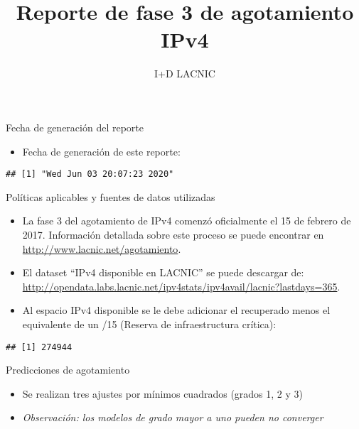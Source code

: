 \documentclass[ignorenonframetext,]{beamer}
\title{Reporte de fase 3 de agotamiento IPv4}
\author{I+D LACNIC}
\date{}
\providecommand{\tightlist}{%
  \setlength{\itemsep}{0pt}\setlength{\parskip}{0pt}}
\begin{document}
\frame{\titlepage}

\begin{frame}[fragile]{Fecha de generación del reporte}
\protect\hypertarget{fecha-de-generaciuxf3n-del-reporte}{}

\begin{itemize}
\tightlist
\item
  Fecha de generación de este reporte:
\end{itemize}

\begin{verbatim}
## [1] "Wed Jun 03 20:07:23 2020"
\end{verbatim}

\end{frame}

\begin{frame}[fragile]{Políticas aplicables y fuentes de datos
utilizadas}
\protect\hypertarget{poluxedticas-aplicables-y-fuentes-de-datos-utilizadas}{}

\begin{itemize}
\item
  La fase 3 del agotamiento de IPv4 comenzó oficialmente el 15 de
  febrero de 2017. Información detallada sobre este proceso se puede
  encontrar en \url{http://www.lacnic.net/agotamiento}.
\item
  El dataset ``IPv4 disponible en LACNIC'' se puede descargar de:
  \url{http://opendata.labs.lacnic.net/ipv4stats/ipv4avail/lacnic?lastdays=365}.
\item
  Al espacio IPv4 disponible se le debe adicionar el recuperado menos el
  equivalente de un /15 (Reserva de infraestructura crítica):
\end{itemize}

\begin{verbatim}
## [1] 274944
\end{verbatim}

\end{frame}

\begin{frame}{Predicciones de agotamiento}
\protect\hypertarget{predicciones-de-agotamiento}{}

\begin{itemize}
\tightlist
\item
  Se realizan tres ajustes por mínimos cuadrados (grados 1, 2 y 3)
\item
  \emph{Observación: los modelos de grado mayor a uno pueden no
  converger}
\end{itemize}

\end{frame}
\end{document}
